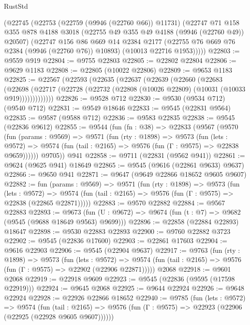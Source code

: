 \begin{lexlean}{RustStd}
\begin{coremodule}
    (@22745
      (@22753
        (@22759 (@9946 (@22760 @66)) @11731)
        (@22747
          @71
          @158
          @355
          @878
          @4188
          @3018
          (@22755 @49 @355 @49 @4188 (@9946 (@22760 @49)) @20507)
          (@22747
            @156
            @86
            @669
            @14
            @2384
            @2177
            (@22755 @76 @669 @76 @2384 (@9946 (@22760 @76)) @10893)
            (@10013 @22716 @1953)))))
@22803 := @9559 @919
@22804 := @9755 @22803
@22805 := @22802 @22804
@22806 := @9629 @1183
@22808 := @22805 (@10022 @22806)
@22809 := @9653 @1183
@22825 := @22567
    (@22593
      (@22635
        (@22637
          (@22639
            (@22660
              (@22683
                (@22698
                  (@22717 (@22728 (@22732 (@22808 (@10026 @22809) (@10031 (@10033 @919)))))))))))))
@22826 := @9528 @712
@22830 := @9530 (@9534 @712) (@9540 @712)
@22831 := @9549 @18646
@22833 := @9545 (@22831 @9564)
@22835 := @9587 (@9588 @712)
@22836 := @9583 @22835
@22838 := @9545 (@22836 @9612)
@22855 := @9544
    (fun (fn : @38) =>
    @22833
      (@9567
        (@9570
          (fun (params : @9569) =>
          @9571
            (fun (rty : @1898) =>
            @9573
              (fun (lets : @9572) =>
              @9574 (fun (tail : @2165) => @9576 (fun (Γ : @9575) => @22838 @9659))))))
        @9705))
    @941
@22858 := @9711 (@22831 (@9562 @941))
@22861 := @9624 (@9625 @941) @18649
@22865 := @9545 (@9616 (@22861 @9633) @9637)
@22866 := @9650 @941
@22871 := @9647 (@9649 @22866 @18652 @9605 @9607)
@22882 := fun (params : @9569) =>
  @9571
    (fun (rty : @1898) =>
    @9573
      (fun (lets : @9572) =>
      @9574 (fun (tail : @2165) => @9576 (fun (Γ : @9575) => @22838 (@22865 @22871)))))
@22883 := @9570 @22882
@22884 := @9567 @22883
@22893 := @9673
    (fun (U : @9672) => @9674 (fun (t : @7) => @9682 (@9545 (@9688 @18649 @9563) @9699)))
@22896 := @22858 (@22884 @22893) @18647
@22898 := @9530 @22883 @22893
@22900 := @9760 @22882 @3723
@22902 := @9545 (@22836 @17600)
@22903 := @22861 @17603
@22904 := @9616 @22903
@22906 := @9545 (@22904 @9637)
@22917 := @9763
    (fun (rty : @1898) =>
    @9573
      (fun (lets : @9572) =>
      @9574 (fun (tail : @2165) => @9576 (fun (Γ : @9575) => @22902 (@22906 @22871)))))
    @2068
@22918 := @9601 @2068
@22919 := @22918 @9609
@22923 := @9545 (@22836 (@9595 (@17598 @22919)))
@22924 := @9645 @2068
@22925 := @9644 @22924
@22926 := @9648 @22924
@22928 := @22926 @22866 @18652
@22940 := @9785
    (fun (lets : @9572) =>
    @9574
      (fun (tail : @2165) =>
      @9576 (fun (Γ : @9575) => @22923 (@22906 (@22925 (@22928 @9605 @9607))))))

\end{coremodule}
\end{lexlean}
